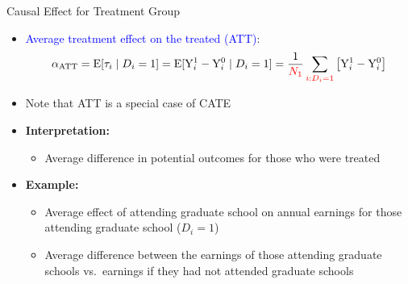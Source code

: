 \documentclass[hyperref={pdfpagelabels=false}]{beamer}
\begin{document}
\begin{frame}{Causal Effect for Treatment Group}
\begin{itemize}
	\vspace{0.2cm}
  \item \textcolor{blue}{Average treatment effect on the treated (ATT)}:
  \begin{equation*}
    \alpha_{\text{ATT}}
    = \mathrm{E}[\tau_i\mid D_i=1]
    = \mathrm{E}[\mathrm{Y}^{1}_{i}-\mathrm{Y}^{0}_{i}\mid D_i=1]
    = \dfrac{1}{\color{red}N_1}\sum_{\color{red}i:D_i=1}\big[\mathrm{Y}^{1}_{i}-\mathrm{Y}^{0}_{i}\big]
  \end{equation*}

  \item Note that ATT is a special case of CATE
	\vspace{0.2cm}

  \item \textbf{Interpretation:}
  \begin{itemize}
	\vspace{0.2cm}
    \item Average difference in potential outcomes for those who were treated
    	\vspace{0.2cm}

  \end{itemize}

  \item \textbf{Example:}
  	\vspace{0.2cm}

  \begin{itemize}
	\vspace{0.2cm}

    \item Average effect of attending graduate school on annual earnings for those attending graduate school ($D_i=1$)
    	\vspace{0.2cm}

    \item Average difference between the earnings of those attending graduate schools vs.\ earnings if they had not attended graduate schools
  \end{itemize}
\end{itemize}
\end{frame}
\end{document}
